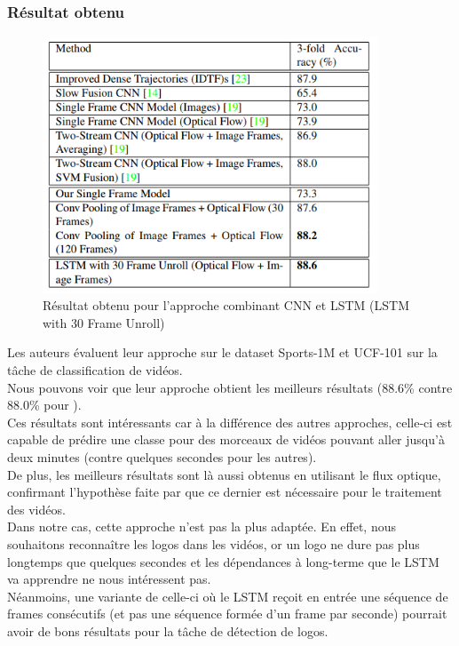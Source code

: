 \documentclass[11pt]{article}
\begin{document}
\subsubsection{Résultat obtenu}
\label{sec:org24e7ebe}
\begin{figure}[htbp]
\centering
\includegraphics[width=10cm]{cnn_lstm_res.png}
\caption{Résultat obtenu pour l'approche combinant CNN et LSTM (LSTM with 30 Frame Unroll) \label{cnn_lstm}}
\end{figure}
Les auteurs évaluent leur approche sur le dataset Sports-1M et UCF-101 sur la tâche de classification de vidéos.\\
Nous pouvons voir que leur approche obtient les meilleurs résultats (88.6\% contre 88.0\% pour \cite{DBLP:journals/corr/SimonyanZ14}).\\
Ces résultats sont intéressants car à la différence des autres approches, celle-ci est capable de prédire une classe pour des morceaux de vidéos pouvant aller jusqu'à deux minutes (contre quelques secondes pour les autres).\\
De plus, les meilleurs résultats sont là aussi obtenus en utilisant le flux optique, confirmant l'hypothèse faite par \cite{DBLP:journals/corr/SimonyanZ14} que ce dernier est nécessaire pour le traitement des vidéos.\\

Dans notre cas, cette approche n'est pas la plus adaptée. En effet, nous souhaitons reconnaître les logos dans les vidéos, or un logo ne dure pas plus longtemps que quelques secondes et les dépendances à long-terme que le LSTM va apprendre ne nous intéressent pas.\\
Néanmoins, une variante de celle-ci où le LSTM reçoit en entrée une séquence de frames consécutifs (et pas une séquence formée d'un frame par seconde) pourrait avoir de bons résultats pour la tâche de détection de logos.\\
\end{document}
